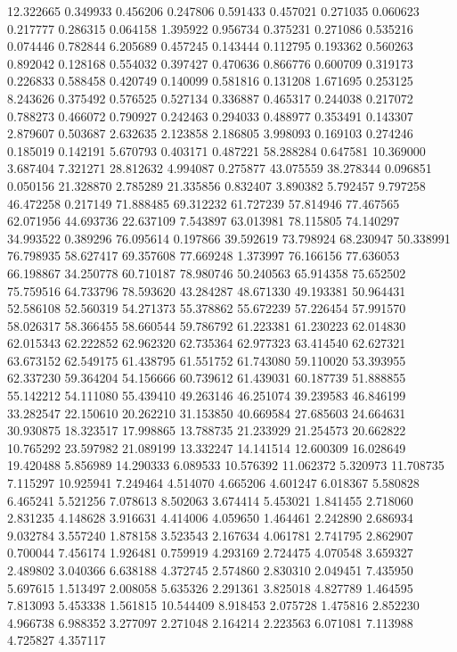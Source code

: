 12.322665
0.349933
0.456206
0.247806
0.591433
0.457021
0.271035
0.060623
0.217777
0.286315
0.064158
1.395922
0.956734
0.375231
0.271086
0.535216
0.074446
0.782844
6.205689
0.457245
0.143444
0.112795
0.193362
0.560263
0.892042
0.128168
0.554032
0.397427
0.470636
0.866776
0.600709
0.319173
0.226833
0.588458
0.420749
0.140099
0.581816
0.131208
1.671695
0.253125
8.243626
0.375492
0.576525
0.527134
0.336887
0.465317
0.244038
0.217072
0.788273
0.466072
0.790927
0.242463
0.294033
0.488977
0.353491
0.143307
2.879607
0.503687
2.632635
2.123858
2.186805
3.998093
0.169103
0.274246
0.185019
0.142191
5.670793
0.403171
0.487221
58.288284
0.647581
10.369000
3.687404
7.321271
28.812632
4.994087
0.275877
43.075559
38.278344
0.096851
0.050156
21.328870
2.785289
21.335856
0.832407
3.890382
5.792457
9.797258
46.472258
0.217149
71.888485
69.312232
61.727239
57.814946
77.467565
62.071956
44.693736
22.637109
7.543897
63.013981
78.115805
74.140297
34.993522
0.389296
76.095614
0.197866
39.592619
73.798924
68.230947
50.338991
76.798935
58.627417
69.357608
77.669248
1.373997
76.166156
77.636053
66.198867
34.250778
60.710187
78.980746
50.240563
65.914358
75.652502
75.759516
64.733796
78.593620
43.284287
48.671330
49.193381
50.964431
52.586108
52.560319
54.271373
55.378862
55.672239
57.226454
57.991570
58.026317
58.366455
58.660544
59.786792
61.223381
61.230223
62.014830
62.015343
62.222852
62.962320
62.735364
62.977323
63.414540
62.627321
63.673152
62.549175
61.438795
61.551752
61.743080
59.110020
53.393955
62.337230
59.364204
54.156666
60.739612
61.439031
60.187739
51.888855
55.142212
54.111080
55.439410
49.263146
46.251074
39.239583
46.846199
33.282547
22.150610
20.262210
31.153850
40.669584
27.685603
24.664631
30.930875
18.323517
17.998865
13.788735
21.233929
21.254573
20.662822
10.765292
23.597982
21.089199
13.332247
14.141514
12.600309
16.028649
19.420488
5.856989
14.290333
6.089533
10.576392
11.062372
5.320973
11.708735
7.115297
10.925941
7.249464
4.514070
4.665206
4.601247
6.018367
5.580828
6.465241
5.521256
7.078613
8.502063
3.674414
5.453021
1.841455
2.718060
2.831235
4.148628
3.916631
4.414006
4.059650
1.464461
2.242890
2.686934
9.032784
3.557240
1.878158
3.523543
2.167634
4.061781
2.741795
2.862907
0.700044
7.456174
1.926481
0.759919
4.293169
2.724475
4.070548
3.659327
2.489802
3.040366
6.638188
4.372745
2.574860
2.830310
2.049451
7.435950
5.697615
1.513497
2.008058
5.635326
2.291361
3.825018
4.827789
1.464595
7.813093
5.453338
1.561815
10.544409
8.918453
2.075728
1.475816
2.852230
4.966738
6.988352
3.277097
2.271048
2.164214
2.223563
6.071081
7.113988
4.725827
4.357117
